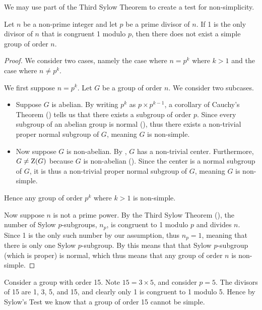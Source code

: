 We may use part of the Third Sylow Theorem to create a test for non-simplicity.
\begin{theorem}
    Let $n$ be a non-prime integer and let $p$ be a prime divisor of $n$. If 1 is the only divisor of $n$ that is congruent 1 modulo $p$, then there does not exist a simple group of order $n$.
\end{theorem}
\begin{proof}
    We consider two cases, namely the case where $n=p^k$ where $k>1$ and the case where $n \neq p^k$.
    
    We first suppose $n = p^k$. Let $G$ be a group of order $n$. We consider two subcases.
    \begin{itemize}
        \item Suppose $G$ is abelian. By writing $p^k$ as $p \times p^{k-1}$, a corollary of Cauchy's Theorem () tells us that there exists a subgroup of order $p$. Since every subgroup of an abelian group is normal (), thus there exists a non-trivial proper normal subgroup of $G$, meaning $G$ is non-simple.
        \item Now suppose $G$ is non-abelian. By , $G$ has a non-trivial center. Furthermore, $G \neq \mathrm{Z}(G)$ because $G$ is non-abelian (). Since the center is a normal subgroup of $G$, it is thus a non-trivial proper normal subgroup of $G$, meaning $G$ is non-simple.
    \end{itemize}
    Hence any group of order $p^k$ where $k > 1$ is non-simple.

    Now suppose $n$ is not a prime power. By the Third Sylow Theorem (), the number of Sylow $p$-subgroups, $n_p$, is congruent to 1 modulo $p$ and divides $n$. Since 1 is the only such number by our assumption, thus $n_p = 1$, meaning that there is only one Sylow $p$-subgroup. By  this means that that Sylow $p$-subgroup (which is proper) is normal, which thus means that any group of order $n$ is non-simple.
\end{proof}
\begin{example}
    Consider a group with order 15. Note $15 = 3 \times 5$, and consider $p = 5$. The divisors of 15 are 1, 3, 5, and 15, and clearly only 1 is congruent to 1 modulo 5. Hence by Sylow's Test we know that a group of order 15 cannot be simple.
\end{example}

